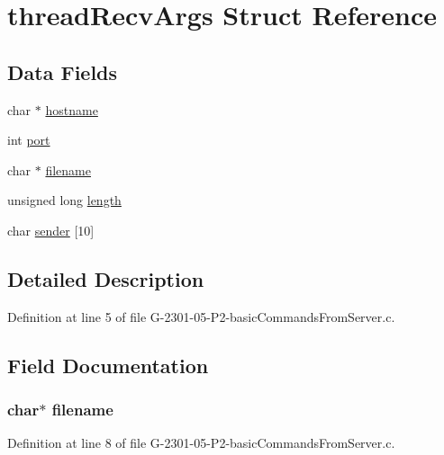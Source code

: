 \hypertarget{structthread_recv_args}{\section{thread\-Recv\-Args Struct Reference}
\label{structthread_recv_args}
}
\subsection*{Data Fields}
\begin{DoxyCompactItemize}
\item 
char $\ast$ \hyperlink{structthread_recv_args_af203df082d5c6dcaa0c88b07cf86466d}{hostname}
\item 
int \hyperlink{structthread_recv_args_a63c89c04d1feae07ca35558055155ffb}{port}
\item 
char $\ast$ \hyperlink{structthread_recv_args_aeac90097f29f7529968697163cea5c18}{filename}
\item 
unsigned long \hyperlink{structthread_recv_args_a9ee64c7b918513891b3834b93ad0e501}{length}
\item 
char \hyperlink{structthread_recv_args_abe5ba910d6dc4c312cb722de3ab377f2}{sender} \mbox{[}10\mbox{]}
\end{DoxyCompactItemize}


\subsection{Detailed Description}


Definition at line 5 of file G-\/2301-\/05-\/\-P2-\/basic\-Commands\-From\-Server.\-c.



\subsection{Field Documentation}
\hypertarget{structthread_recv_args_aeac90097f29f7529968697163cea5c18}{
\subsubsection[{filename}]{\setlength{\rightskip}{0pt plus 5cm}char$\ast$ filename}}\label{structthread_recv_args_aeac90097f29f7529968697163cea5c18}


Definition at line 8 of file G-\/2301-\/05-\/\-P2-\/basic\-Commands\-From\-Server.\-c.

